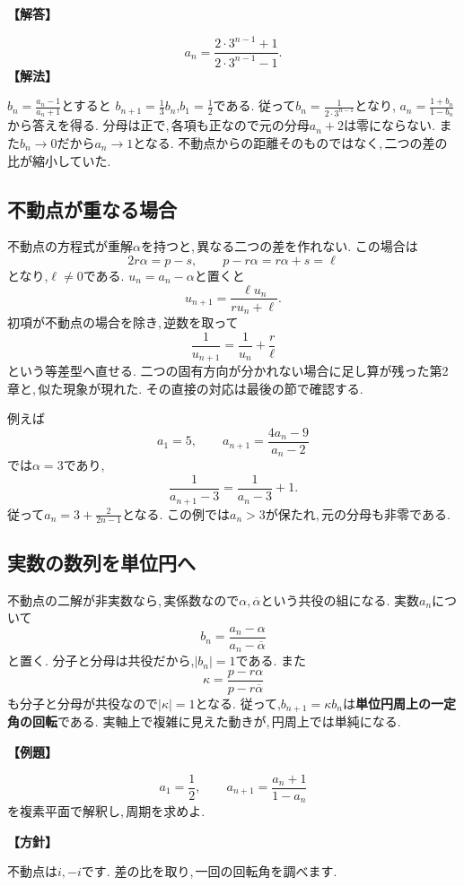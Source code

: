\noindent\textbf{【解答】}\par\nobreak
\[
 a_n=\frac{2\cdot3^{n-1}+1}{2\cdot3^{n-1}-1}.
\]
\noindent\textbf{【解法】}\par\nobreak
$b_n=\frac{a_n-1}{a_n+1}$とすると
$b_{n+1}=\frac13b_n$,$b_1=\frac12$である.
従って$b_n=\frac1{2\cdot3^{n-1}}$となり,
$a_n=\frac{1+b_n}{1-b_n}$から答えを得る.
分母は正で,\,各項も正なので元の分母$a_n+2$は零にならない.
また$b_n\to0$だから$a_n\to1$となる.
不動点からの距離そのものではなく,\,二つの差の比が縮小していた.

\subsection{不動点が重なる場合}

不動点の方程式が重解$\alpha$を持つと,\,異なる二つの差を作れない.
この場合は
\[
 2r\alpha=p-s,\qquad
 p-r\alpha=r\alpha+s=\ell
\]
となり,$\ell\ne0$である.
$u_n=a_n-\alpha$と置くと
\[
 u_{n+1}=\frac{\ell u_n}{ru_n+\ell}.
\]
初項が不動点の場合を除き,\,逆数を取って
\[
 \frac1{u_{n+1}}=\frac1{u_n}+\frac r\ell
\]
という等差型へ直せる.
二つの固有方向が分かれない場合に足し算が残った第2章と,\,似た現象が現れた.
その直接の対応は最後の節で確認する.

例えば
\[
 a_1=5,\qquad a_{n+1}=\frac{4a_n-9}{a_n-2}
\]
では$\alpha=3$であり,
\[
 \frac1{a_{n+1}-3}=\frac1{a_n-3}+1.
\]
従って$a_n=3+\frac2{2n-1}$となる.
この例では$a_n>3$が保たれ,\,元の分母も非零である.

\subsection{実数の数列を単位円へ}

不動点の二解が非実数なら,\,実係数なので$\alpha,\overline\alpha$という共役の組になる.
実数$a_n$について
\[
 b_n=\frac{a_n-\alpha}{a_n-\overline\alpha}
\]
と置く.
分子と分母は共役だから,$|b_n|=1$である.
また
\[
 \kappa=\frac{p-r\alpha}{p-r\overline\alpha}
\]
も分子と分母が共役なので$|\kappa|=1$となる.
従って,$b_{n+1}=\kappa b_n$は\textbf{単位円周上の一定角の回転}である.
実軸上で複雑に見えた動きが,\,円周上では単純になる.

\noindent\textbf{【例題】}\par\nobreak
\[
 a_1=\frac12,\qquad a_{n+1}=\frac{a_n+1}{1-a_n}
\]
を複素平面で解釈し,\,周期を求めよ.

\noindent\textbf{【方針】}\par\nobreak
不動点は$i,-i$です. 差の比を取り,\,一回の回転角を調べます.

